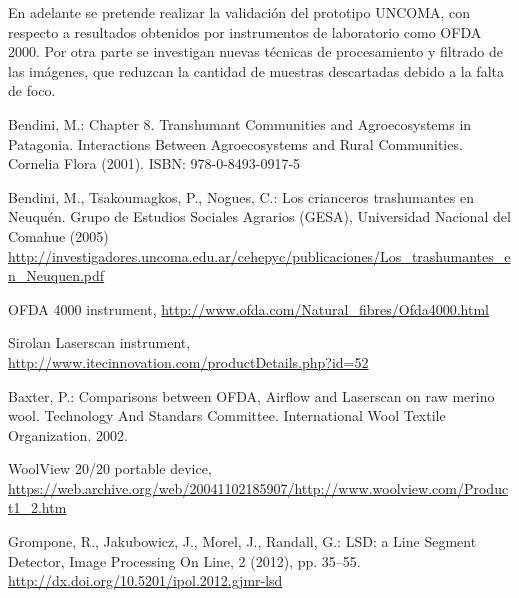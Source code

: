 \documentclass[runningheads,a4paper]{llncs}
\begin{document}
En adelante se pretende realizar la validación del prototipo UNCOMA, con 
respecto a resultados obtenidos por instrumentos de laboratorio como OFDA 2000.
Por otra parte se investigan nuevas técnicas de procesamiento y filtrado 
de las imágenes, que reduzcan la cantidad de muestras descartadas 
debido a la falta de foco.

\begin{thebibliography}{4}
 Bendini, M.: Chapter 8. Transhumant Communities and Agroecosystems in Patagonia. Interactions Between Agroecosystems and Rural Communities.
Cornelia Flora (2001). ISBN: 978-0-8493-0917-5

 Bendini, M., Tsakoumagkos, P., Nogues, C.: Los crianceros trashumantes en Neuquén. Grupo de Estudios Sociales Agrarios (GESA),
 Universidad Nacional del Comahue (2005)
\url{http://investigadores.uncoma.edu.ar/cehepyc/publicaciones/Los_trashumantes_en_Neuquen.pdf}


 OFDA 4000 instrument, \url{http://www.ofda.com/Natural_fibres/Ofda4000.html}


 Sirolan Laserscan instrument, \url{http://www.itecinnovation.com/productDetails.php?id=52}

 Baxter, P.: Comparisons between OFDA, Airflow and Laserscan on raw merino wool. Technology And Standars Committee. International Wool Textile Organization. 2002.

 WoolView 20/20 portable device, \url{https://web.archive.org/web/20041102185907/http://www.woolview.com/Product1_2.htm}

 Grompone, R., Jakubowicz, J., Morel, J., Randall, G.: LSD: a Line Segment Detector, Image Processing On Line, 2 (2012), pp. 35–55.
\url{http://dx.doi.org/10.5201/ipol.2012.gjmr-lsd}



\end{thebibliography}
\end{document}
